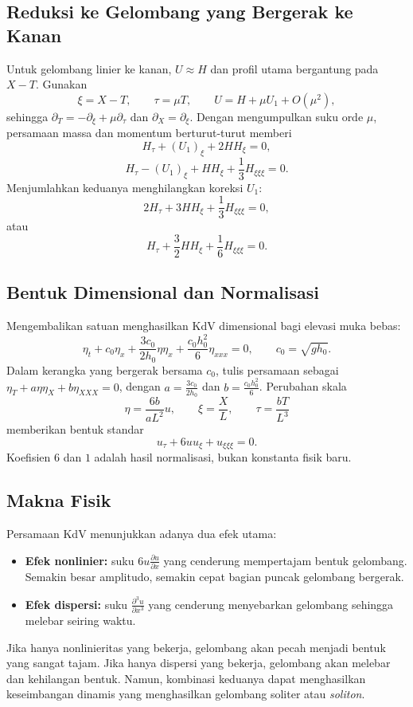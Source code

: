 \documentclass{bukumjh}
\begin{document}
\subsection{Reduksi ke Gelombang yang Bergerak ke Kanan}
Untuk gelombang linier ke kanan, $U\approx H$ dan profil utama bergantung pada $X-T$. Gunakan
\[
\xi=X-T, \qquad \tau=\mu T, \qquad U=H+\mu U_1+O(\mu^2),
\]
sehingga $\partial_T=-\partial_\xi+\mu\partial_\tau$ dan $\partial_X=\partial_\xi$. Dengan mengumpulkan suku orde $\mu$, persamaan massa dan momentum berturut-turut memberi
\[
H_\tau+(U_1)_\xi+2HH_\xi=0,
\]
\[
H_\tau-(U_1)_\xi+HH_\xi+\frac13H_{\xi\xi\xi}=0.
\]
Menjumlahkan keduanya menghilangkan koreksi $U_1$:
\[
2H_\tau+3HH_\xi+\frac13H_{\xi\xi\xi}=0,
\]
atau
\[
H_\tau+\frac32HH_\xi+\frac16H_{\xi\xi\xi}=0.
\]

\subsection{Bentuk Dimensional dan Normalisasi}
Mengembalikan satuan menghasilkan KdV dimensional bagi elevasi muka bebas:
\[
\eta_t+c_0\eta_x+\frac{3c_0}{2h_0}\eta\eta_x+\frac{c_0h_0^2}{6}\eta_{xxx}=0,
\qquad c_0=\sqrt{gh_0}.
\]
Dalam kerangka yang bergerak bersama $c_0$, tulis persamaan sebagai $\eta_T+a\eta\eta_X+b\eta_{XXX}=0$, dengan $a=\frac{3c_0}{2h_0}$ dan $b=\frac{c_0h_0^2}{6}$. Perubahan skala
\[
\eta=\frac{6b}{aL^2}u, \qquad \xi=\frac{X}{L}, \qquad \tau=\frac{bT}{L^3}
\]
memberikan bentuk standar
\begin{equation}
u_\tau+6u u_\xi+u_{\xi\xi\xi}=0.
\end{equation}
Koefisien $6$ dan $1$ adalah hasil normalisasi, bukan konstanta fisik baru.

\subsection*{Makna Fisik}
Persamaan KdV menunjukkan adanya dua efek utama:
\begin{itemize}
  \item \textbf{Efek nonlinier:} suku $6u \frac{\partial u}{\partial x}$ yang cenderung mempertajam bentuk gelombang. Semakin besar amplitudo, semakin cepat bagian puncak gelombang bergerak.
  \item \textbf{Efek dispersi:} suku $\frac{\partial^3 u}{\partial x^3}$ yang cenderung menyebarkan gelombang sehingga melebar seiring waktu.
\end{itemize}

Jika hanya nonlinieritas yang bekerja, gelombang akan pecah menjadi bentuk yang sangat tajam. 
Jika hanya dispersi yang bekerja, gelombang akan melebar dan kehilangan bentuk. 
Namun, kombinasi keduanya dapat menghasilkan keseimbangan dinamis yang menghasilkan gelombang soliter atau \emph{soliton}.
\end{document}
